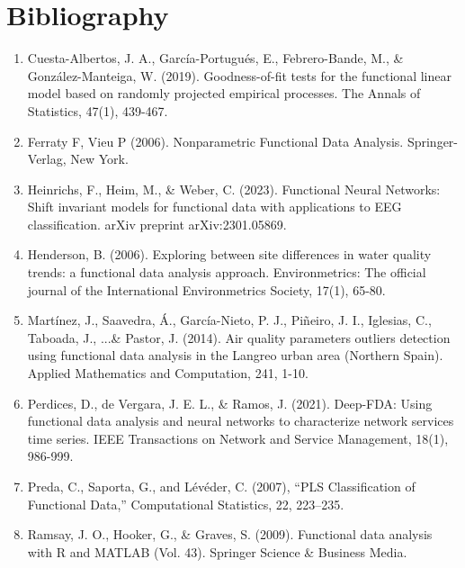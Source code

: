 \documentclass[
11pt, %
oneside, %
english, %
singlespacing, %
liststotoc, %
toctotoc, %
headsepline, %
]{MastersDoctoralThesis} %
\begin{document}
%
%
%
%
%

\section{Bibliography}
\begin{enumerate}
\item Cuesta-Albertos, J. A., García-Portugués, E., Febrero-Bande, M., \& González-Manteiga, W. (2019). Goodness-of-fit tests for the functional linear model based on randomly projected empirical processes. The Annals of Statistics, 47(1), 439-467.
\item Ferraty F, Vieu P (2006). Nonparametric Functional Data Analysis. Springer-Verlag, New York.  
\item Heinrichs, F., Heim, M., \& Weber, C. (2023). Functional Neural Networks: Shift invariant models for functional data with applications to EEG classification. arXiv preprint arXiv:2301.05869.
\item Henderson, B. (2006). Exploring between site differences in water quality trends: a functional data analysis approach. Environmetrics: The official journal of the International Environmetrics Society, 17(1), 65-80.
\item Martínez, J., Saavedra, Á., García-Nieto, P. J., Piñeiro, J. I., Iglesias, C., Taboada, J., ...\& Pastor, J. (2014). Air quality parameters outliers detection using functional data analysis in the Langreo urban area (Northern Spain). Applied Mathematics and Computation, 241, 1-10.
\item Perdices, D., de Vergara, J. E. L., \& Ramos, J. (2021). Deep-FDA: Using functional data analysis and neural networks to characterize network services time series. IEEE Transactions on Network and Service Management, 18(1), 986-999.
\item Preda, C., Saporta, G., and Lévéder, C. (2007), “PLS Classification of Functional Data,” Computational Statistics, 22, 223–235.  
\item Ramsay, J. O., Hooker, G., \& Graves, S. (2009). Functional data analysis with R and MATLAB (Vol. 43). Springer Science \& Business Media.

\end{enumerate}
\end{document}
